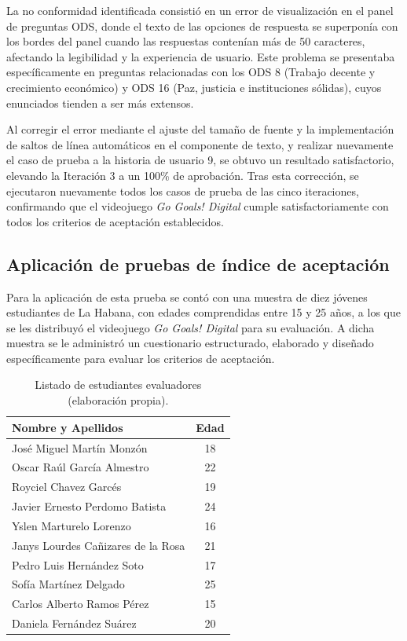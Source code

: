 La no conformidad identificada consistió en un error de visualización en el panel de preguntas ODS, donde el texto de las opciones de respuesta se superponía con los bordes del panel cuando las respuestas contenían más de 50 caracteres, afectando la legibilidad y la experiencia de usuario. Este problema se presentaba específicamente en preguntas relacionadas con los ODS 8 (Trabajo decente y crecimiento económico) y ODS 16 (Paz, justicia e instituciones sólidas), cuyos enunciados tienden a ser más extensos.

Al corregir el error mediante el ajuste del tamaño de fuente y la implementación de saltos de línea automáticos en el componente de texto, y realizar nuevamente el caso de prueba a la historia de usuario 9, se obtuvo un resultado satisfactorio, elevando la Iteración 3 a un 100\% de aprobación. Tras esta corrección, se ejecutaron nuevamente todos los casos de prueba de las cinco iteraciones, confirmando que el videojuego \textit{Go Goals! Digital} cumple satisfactoriamente con todos los criterios de aceptación establecidos.

\subsection{Aplicación de pruebas de índice de aceptación}
\label{subsec:aplicacion_pruebas_indice}

Para la aplicación de esta prueba se contó con una muestra de diez jóvenes estudiantes de La Habana, con edades comprendidas entre 15 y 25 años, a los que se les distribuyó el videojuego \textit{Go Goals! Digital} para su evaluación. A dicha muestra se le administró un cuestionario estructurado, elaborado y diseñado específicamente para evaluar los criterios de aceptación.

\begin{table}[htbp]
\centering
\caption{Listado de estudiantes evaluadores (elaboración propia).\label{tab:probadores_beta}}
\renewcommand{\arraystretch}{1.3}
\begin{tabular}{|l|c|}
\hline
\textbf{Nombre y Apellidos} & \textbf{Edad} \\
\hline
José Miguel Martín Monzón & 18 \\
\hline
Oscar Raúl García Almestro & 22 \\
\hline
Royciel Chavez Garcés & 19 \\
\hline
Javier Ernesto Perdomo Batista & 24 \\
\hline
Yslen Marturelo Lorenzo & 16 \\
\hline
Janys Lourdes Cañizares de la Rosa & 21 \\
\hline
Pedro Luis Hernández Soto & 17 \\
\hline
Sofía Martínez Delgado & 25 \\
\hline
Carlos Alberto Ramos Pérez & 15 \\
\hline
Daniela Fernández Suárez & 20 \\
\hline
\end{tabular}
\end{table}

